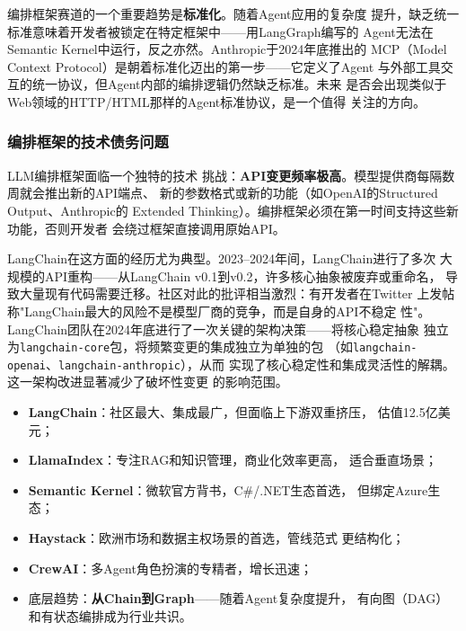 编排框架赛道的一个重要趋势是\textbf{标准化}。随着Agent应用的复杂度
提升，缺乏统一标准意味着开发者被锁定在特定框架中——用LangGraph编写的
Agent无法在Semantic Kernel中运行，反之亦然。Anthropic于2024年底推出的
MCP（Model Context Protocol）是朝着标准化迈出的第一步——它定义了Agent
与外部工具交互的统一协议，但Agent内部的编排逻辑仍然缺乏标准。未来
是否会出现类似于Web领域的HTTP/HTML那样的Agent标准协议，是一个值得
关注的方向。

\subsubsection{编排框架的技术债务问题} LLM编排框架面临一个独特的技术
挑战：\textbf{API变更频率极高}。模型提供商每隔数周就会推出新的API端点、
新的参数格式或新的功能（如OpenAI的Structured Output、Anthropic的
Extended Thinking）。编排框架必须在第一时间支持这些新功能，否则开发者
会绕过框架直接调用原始API。

LangChain在这方面的经历尤为典型。2023--2024年间，LangChain进行了多次
大规模的API重构——从LangChain v0.1到v0.2，许多核心抽象被废弃或重命名，
导致大量现有代码需要迁移。社区对此的批评相当激烈：有开发者在Twitter
上发帖称"LangChain最大的风险不是模型厂商的竞争，而是自身的API不稳定
性"。LangChain团队在2024年底进行了一次关键的架构决策——将核心稳定抽象
独立为\texttt{langchain-core}包，将频繁变更的集成独立为单独的包
（如\texttt{langchain-openai}、\texttt{langchain-anthropic}），从而
实现了核心稳定性和集成灵活性的解耦。这一架构改进显著减少了破坏性变更
的影响范围。

\begin{corebox}[编排框架的竞争格局总结]
\begin{itemize}
  \item \textbf{LangChain}：社区最大、集成最广，但面临上下游双重挤压，
    估值12.5亿美元；
  \item \textbf{LlamaIndex}：专注RAG和知识管理，商业化效率更高，
    适合垂直场景；
  \item \textbf{Semantic Kernel}：微软官方背书，C\#/.NET生态首选，
    但绑定Azure生态；
  \item \textbf{Haystack}：欧洲市场和数据主权场景的首选，管线范式
    更结构化；
  \item \textbf{CrewAI}：多Agent角色扮演的专精者，增长迅速；
  \item 底层趋势：\textbf{从Chain到Graph}——随着Agent复杂度提升，
    有向图（DAG）和有状态编排成为行业共识。
\end{itemize}
\end{corebox}


